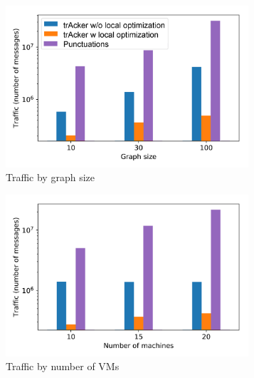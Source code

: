 \begin{figure}[t!]
    \begin{subfigure}[b]{0.25\textwidth}
            \includegraphics[width=0.99\textwidth]{pics/traffic_by_graph_size_bars.png}
            \caption{Traffic by graph size}
            \label{traffic_graph}
    \end{subfigure}
    \hspace{5mm}
    \begin{subfigure}[b]{0.25\textwidth}
            \includegraphics[width=0.99\textwidth]{pics/traffic_by_number_of_machines_bars.png}
            \caption{Traffic by number of VMs}
            \label{traffic_machines}
    \end{subfigure}
    \hspace{5mm}
    \begin{subfigure}[b]{0.25\textwidth}

\end{subfigure}
\end{figure}
